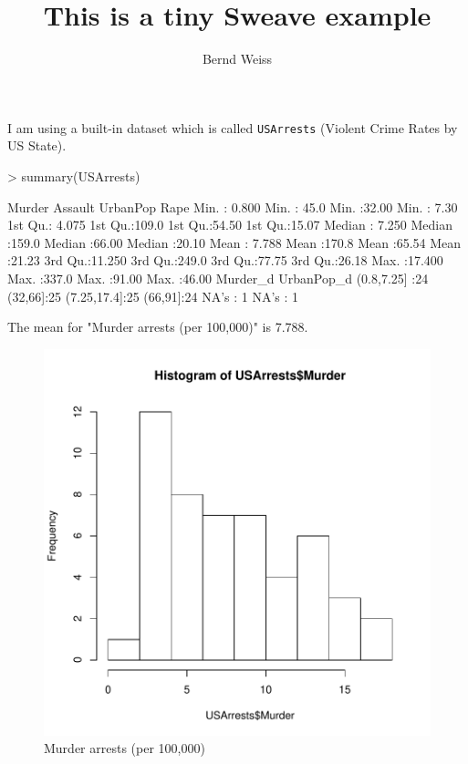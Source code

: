 \documentclass[noae]{article}
\title{This is a tiny Sweave example}
\author{Bernd Weiss}
\begin{document}
\maketitle

I am using a built-in dataset which is called \texttt{USArrests} 
(Violent Crime Rates by US State).

\begin{Schunk}
\begin{Sinput}
> summary(USArrests)
\end{Sinput}
\begin{Soutput}
     Murder          Assault         UrbanPop          Rape      
 Min.   : 0.800   Min.   : 45.0   Min.   :32.00   Min.   : 7.30  
 1st Qu.: 4.075   1st Qu.:109.0   1st Qu.:54.50   1st Qu.:15.07  
 Median : 7.250   Median :159.0   Median :66.00   Median :20.10  
 Mean   : 7.788   Mean   :170.8   Mean   :65.54   Mean   :21.23  
 3rd Qu.:11.250   3rd Qu.:249.0   3rd Qu.:77.75   3rd Qu.:26.18  
 Max.   :17.400   Max.   :337.0   Max.   :91.00   Max.   :46.00  
        Murder_d    UrbanPop_d
 (0.8,7.25] :24   (32,66]:25  
 (7.25,17.4]:25   (66,91]:24  
 NA's       : 1   NA's   : 1  
\end{Soutput}
\end{Schunk}

The mean for "Murder arrests (per 100,000)" is 7.788.


\begin{figure}[h!]
\begin{center}
\includegraphics{examp_sweave-01-002}
\end{center}
\caption{Murder arrests (per 100,000)}
\end{figure}
\end{document}
